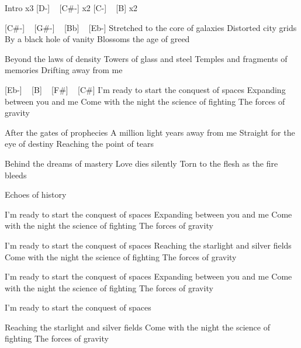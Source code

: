 Intro x3
[D-] ~ [C#-] x2
[C-] ~ [B] x2

[C#-] ~ [G#-] ~ [Bb] ~ [Eb-]
Stretched to the core of galaxies
Distorted city grids
By a black hole of vanity
Blossoms the age of greed

Beyond the laws of density
Towers of glass and steel
Temples and fragments of memories
Drifting away from me

[Eb-] ~ [B] ~ [F#] ~ [C#]
I'm ready to start the conquest of spaces
Expanding between you and me
Come with the night the science of fighting
The forces of gravity

After the gates of prophecies
A million light years away from me
Straight for the eye of destiny
Reaching the point of tears

Behind the dreams of mastery
Love dies silently
Torn to the flesh as the fire bleeds

Echoes of history

I'm ready to start the conquest of spaces
Expanding between you and me
Come with the night the science of fighting
The forces of gravity

I'm ready to start the conquest of spaces
Reaching the starlight and silver fields
Come with the night the science of fighting
The forces of gravity

I'm ready to start the conquest of spaces
Expanding between you and me
Come with the night the science of fighting
The forces of gravity

I'm ready to start the conquest of spaces

Reaching the starlight and silver fields
Come with the night the science of fighting
The forces of gravity 